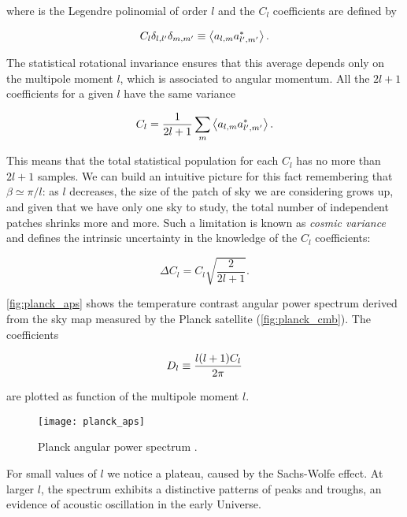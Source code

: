 where is the Legendre polinomial of order $l$ and the $C_l$ coefficients
are defined by

\begin{equation}
        C_l \delta_{l,l'} \delta_{m,m'} \equiv \expval{a_{l,m} a^*_{l',m'}}.
\end{equation}

The statistical rotational
invariance ensures that this average depends only on the multipole moment
$l$, which is associated to angular momentum. All the $2l + 1$ coefficients
for a given $l$ have the same variance

\begin{equation}
        C_l = \frac{1}{2l + 1} \sum_m \expval{a_{l,m} a^*_{l',m'}}.
\end{equation}

This means that the total statistical population for each $C_l$ has no more
than $2l + 1$ samples. We can build an intuitive picture for this fact
remembering that $\beta \simeq \pi/l$: as $l$ decreases, the size of
the patch of sky we are considering grows up, and given that we have only
one sky to study, the total number of independent patches shrinks more and
more. Such a limitation is known as \emph{cosmic variance} and defines the
intrinsic uncertainty in the knowledge of the $C_l$ coefficients:

\begin{equation}
        \Delta C_l = C_l \sqrt{\frac{2}{2l + 1}}.
\end{equation}

\autoref{fig:planck_aps} shows the temperature contrast angular power
spectrum derived from the sky map measured by the
Planck satellite (\autoref{fig:planck_cmb}). The coefficients

\begin{equation}
        D_l \equiv \frac{l\qty(l + 1)C_l}{2\pi}
\end{equation}

are plotted as function of the multipole moment $l$.

\begin{figure}
        \centering
        \texttt{[image: planck\_aps]}
        \caption{Planck angular power spectrum \autocite{ade2016planck}.}
        \label{fig:planck_aps}
\end{figure}

For small values of $l$ we notice a plateau, caused by the Sachs-Wolfe
effect. At larger $l$, the spectrum exhibits a distinctive patterns of
peaks and troughs, an evidence of acoustic oscillation in the
early Universe.


